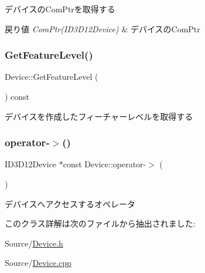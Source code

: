 デバイスの\+Com\+Ptrを取得する 
\begin{DoxyRetVals}{戻り値}
{\em Com\+Ptr(\+I\+D3\+D12\+Device)} & デバイスの\+Com\+Ptr \\
\hline
\end{DoxyRetVals}
\mbox{\label{class_device_af4104295c9c70394b50426f745988d21}} 
\subsubsection{\texorpdfstring{Get\+Feature\+Level()}{GetFeatureLevel()}}
{\footnotesize\ttfamily Device\+::\+Get\+Feature\+Level (\begin{DoxyParamCaption}{ }\end{DoxyParamCaption}) const}

デバイスを作成したフィーチャーレベルを取得する \mbox{\label{class_device_a9cdad6c4f4eae466f20b80cf6f9934d9}} 
\subsubsection{\texorpdfstring{operator-\/$>$()}{operator->()}}
{\footnotesize\ttfamily I\+D3\+D12\+Device $\ast$const Device\+::operator-\/$>$ (\begin{DoxyParamCaption}{ }\end{DoxyParamCaption})}



デバイスへアクセスするオペレータ 



このクラス詳解は次のファイルから抽出されました\+:\begin{DoxyCompactItemize}
\item 
Source/\mbox{\hyperlink{_device_8h}{Device.\+h}}\item 
Source/\mbox{\hyperlink{_device_8cpp}{Device.\+cpp}}\end{DoxyCompactItemize}
